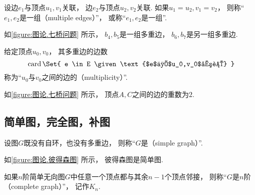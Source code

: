 \begin{figure}[hbt]
	\centering
	\caption{}
	\label{figure:图论.带有自环的无向图}
\end{figure}

\begin{definition}
设边\(e_1\)与顶点\(u_1,v_1\)关联，
边\(e_2\)与顶点\(u_2,v_2\)关联.
如果\(u_1 = u_2,
v_1 = v_2\)，
则称“\(e_1,e_2\)是一组（multiple edges）”，
或称“\(e_1,e_2\)是一组”.
\end{definition}

如\cref{figure:图论.七桥问题} 所示，
\(b_4,b_5\)是一组多重边，
\(b_6,b_7\)是另一组多重边.

\begin{definition}
给定顶点\(u_0,v_0\)，
其多重边的边数\begin{equation*}
	\card\Set{
		e \in E
		\given
		\text{$e$与$u_0,v_0$关联}
	}
\end{equation*}
称为“\(u_0\)与\(v_0\)之间的边的（multiplicity）”.
\end{definition}

如\cref{figure:图论.七桥问题} 所示，
顶点\(A,C\)之间的边的重数为\(2\).

\subsection{简单图，完全图，补图}
\begin{definition}
设图\(G\)既没有自环，也没有多重边，
则称“\(G\)是（simple graph）”.
\end{definition}

如\cref{figure:图论.彼得森图} 所示，
彼得森图是简单图.

\begin{definition}
如果\(n\)阶简单无向图\(G\)中任意一个顶点都与其余\(n-1\)个顶点邻接，
则称“\(G\)是\(n\)阶（complete graph）”，
记作\(K_n\).
\end{definition}

